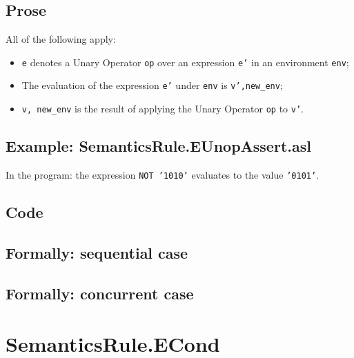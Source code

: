 \documentclass{book}
\begin{document}
  \subsection{Prose}
  All of the following apply:
  \begin{itemize}
  \item \texttt{e} denotes a Unary Operator \texttt{op} over an expression \texttt{e'} in an environment \texttt{env};
  \item The evaluation of the expression \texttt{e'} under \texttt{env} is \texttt{v',new\_env};
  \item \texttt{v, new\_env} is the result of applying the Unary Operator \texttt{op} to \texttt{v'}.
  \end{itemize}

  \subsection{Example: SemanticsRule.EUnopAssert.asl}
    In the program:
    the expression \texttt{NOT '1010'} evaluates to the value \texttt{'0101'}.

  \subsection{Code}

\begin{emptyformal}
  \subsection{Formally: sequential case}

  \subsection{Formally: concurrent case}
\end{emptyformal}


\section{SemanticsRule.ECond \label{sec:SemanticsRule.ECond}}
\end{document}
